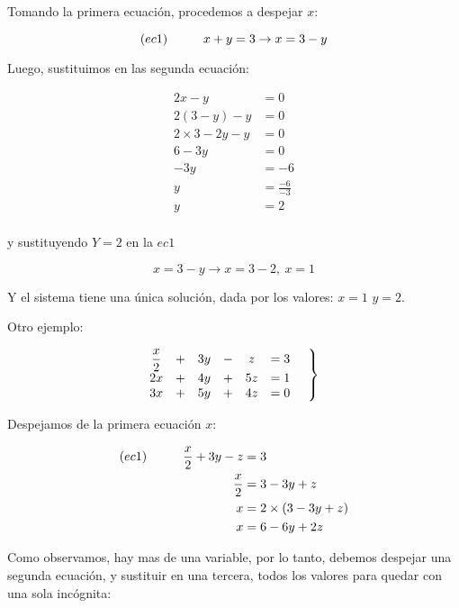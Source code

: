     Tomando la primera ecuación, procedemos a despejar $x$:

    $$(ec1)\hspace*{1cm} x+y=3 \rightarrow x=3-y $$

    Luego, sustituimos en las segunda ecuación:

    \begin{align*}
        2x-y &= 0		\\
        2(3-y)-y &=0    \\
        2\times3 -2y-y&= 0\\
        6-3y &= 0   \\
        -3y &= -6   \\
        y &= \frac{-6}{-3} \\
        y &= 2\\
    \end{align*}

    y sustituyendo $ Y=2 $ en la $ec1$


    $$ x=3-y \rightarrow x=3-2, \ x=1 $$

    Y el sistema tiene una única solución, dada por los valores:
    $ x=1 $  $ y=2 $.


    Otro ejemplo:

    \begin{equation*}
        \left.
        \begin{matrix}
            \displaystyle\frac{x}{2} &+& 3y &-& z &= 3 \\
            2x &+& 4y &+&5z &= 1\\
            3x &+& 5y &+& 4z &=0
        \end{matrix}
        \hspace*{0.5cm}\right\rbrace
    \end{equation*}

    Despejamos de la primera ecuación $x$:

    \begin{align*}
        (ec1)\hspace*{1cm} \displaystyle\frac{x}{2} +3y-z&=3 \\
        \displaystyle\frac{x}{2} &= 3-3y+z\\
        x&= 2\times(3-3y+z)\\
        x&= 6-6y+2z
    \end{align*}

    Como observamos, hay mas de una variable, por lo tanto, debemos despejar
    una segunda ecuación, y sustituir en una tercera, todos los valores para
    quedar con una sola incógnita:

